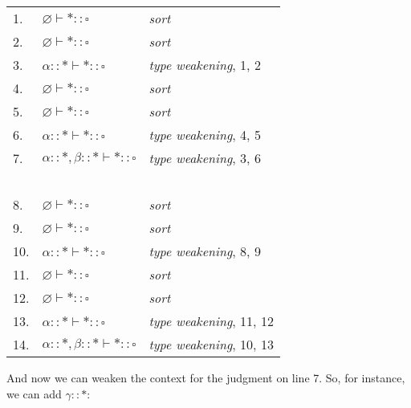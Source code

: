 \documentclass{book}
\numberwithin{equation}{chapter}
\begin{document}
\begin{center}
\begin{tabular}[t]{l l l}
1. & $\varnothing \vdash \ast :: \square$ & \textit{sort} \\
2. & $\varnothing \vdash \ast :: \square$ & \textit{sort} \\
3. & $\alpha :: \ast \vdash \ast :: \square$ & \textit{type weakening}, 1, 2 \\
4. & $\varnothing \vdash \ast :: \square$ & \textit{sort} \\
5. & $\varnothing \vdash \ast :: \square$ & \textit{sort} \\
6. & $\alpha :: \ast \vdash \ast :: \square$ & \textit{type weakening}, 4, 5 \\
7. & $\alpha :: \ast, \beta :: \ast \vdash \ast :: \square$ & \textit{type weakening}, 3, 6 \\
~ & ~ & \\
8. & $\varnothing \vdash \ast :: \square$ & \textit{sort} \\
9. & $\varnothing \vdash \ast :: \square$ & \textit{sort} \\
10. & $\alpha :: \ast \vdash \ast :: \square$ & \textit{type weakening}, 8, 9 \\
11. & $\varnothing \vdash \ast :: \square$ & \textit{sort} \\
12. & $\varnothing \vdash \ast :: \square$ & \textit{sort} \\
13. & $\alpha :: \ast \vdash \ast :: \square$ & \textit{type weakening}, 11, 12 \\
14. & $\alpha :: \ast, \beta :: \ast \vdash \ast :: \square$ & \textit{type weakening}, 10, 13 \\
\end{tabular}
\end{center}

\noindent
And now we can weaken the context for the judgment on line 7. So, for instance, we can add $\gamma :: \ast$:
\end{document}

